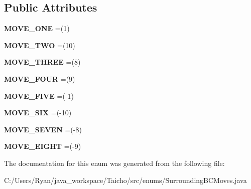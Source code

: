 \subsection*{Public Attributes}
\begin{DoxyCompactItemize}
\item 
\hypertarget{enumenums_1_1_surrounding_b_c_moves_a0328424c38ee5f921a84b2abb544bc2f}{{\bfseries M\-O\-V\-E\-\_\-\-O\-N\-E} =(1)}\label{enumenums_1_1_surrounding_b_c_moves_a0328424c38ee5f921a84b2abb544bc2f}

\item 
\hypertarget{enumenums_1_1_surrounding_b_c_moves_a0738249e8227cdd2d1c261497cbabb0b}{{\bfseries M\-O\-V\-E\-\_\-\-T\-W\-O} =(10)}\label{enumenums_1_1_surrounding_b_c_moves_a0738249e8227cdd2d1c261497cbabb0b}

\item 
\hypertarget{enumenums_1_1_surrounding_b_c_moves_a4f0e219a3fcdf218d10d3de8402737a5}{{\bfseries M\-O\-V\-E\-\_\-\-T\-H\-R\-E\-E} =(8)}\label{enumenums_1_1_surrounding_b_c_moves_a4f0e219a3fcdf218d10d3de8402737a5}

\item 
\hypertarget{enumenums_1_1_surrounding_b_c_moves_ad1164026366d45f5b5f2a9493580a732}{{\bfseries M\-O\-V\-E\-\_\-\-F\-O\-U\-R} =(9)}\label{enumenums_1_1_surrounding_b_c_moves_ad1164026366d45f5b5f2a9493580a732}

\item 
\hypertarget{enumenums_1_1_surrounding_b_c_moves_a5fe16805445a688f9827f8c11926e63e}{{\bfseries M\-O\-V\-E\-\_\-\-F\-I\-V\-E} =(-\/1)}\label{enumenums_1_1_surrounding_b_c_moves_a5fe16805445a688f9827f8c11926e63e}

\item 
\hypertarget{enumenums_1_1_surrounding_b_c_moves_a78301434b597b4d899b00764c25adb14}{{\bfseries M\-O\-V\-E\-\_\-\-S\-I\-X} =(-\/10)}\label{enumenums_1_1_surrounding_b_c_moves_a78301434b597b4d899b00764c25adb14}

\item 
\hypertarget{enumenums_1_1_surrounding_b_c_moves_a7f14ce5a693e5f41f89e5a219a8dd9be}{{\bfseries M\-O\-V\-E\-\_\-\-S\-E\-V\-E\-N} =(-\/8)}\label{enumenums_1_1_surrounding_b_c_moves_a7f14ce5a693e5f41f89e5a219a8dd9be}

\item 
\hypertarget{enumenums_1_1_surrounding_b_c_moves_aa98ca23927fae8a11574a88e65cd850c}{{\bfseries M\-O\-V\-E\-\_\-\-E\-I\-G\-H\-T} =(-\/9)}\label{enumenums_1_1_surrounding_b_c_moves_aa98ca23927fae8a11574a88e65cd850c}

\end{DoxyCompactItemize}


The documentation for this enum was generated from the following file\-:\begin{DoxyCompactItemize}
\item 
C\-:/\-Users/\-Ryan/java\-\_\-workspace/\-Taicho/src/enums/Surrounding\-B\-C\-Moves.\-java\end{DoxyCompactItemize}

